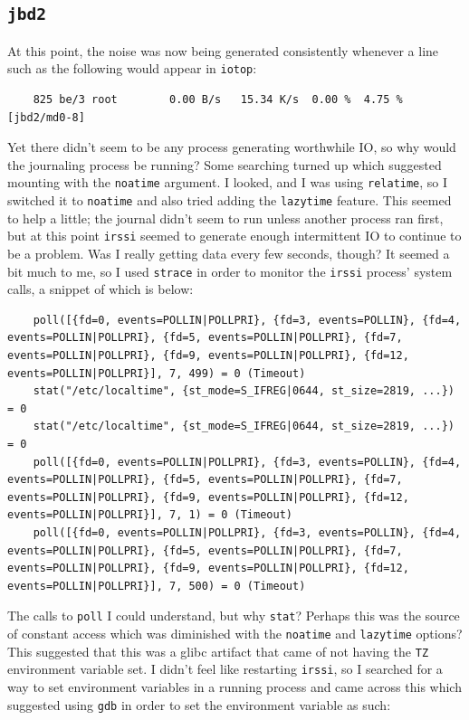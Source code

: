 \documentclass{article}
\begin{document}
\subsection{\texttt{jbd2}}
At this point, the noise was now being generated consistently whenever a line such as the following would appear in \texttt{iotop}:
\begin{verbatim}
	825 be/3 root        0.00 B/s   15.34 K/s  0.00 %  4.75 % [jbd2/md0-8]
\end{verbatim}
Yet there didn't seem to be any process generating worthwhile IO, so why would the journaling process be running?  Some searching turned up  which suggested mounting with the \texttt{noatime} argument.  I looked, and I was using \texttt{relatime}, so I switched it to \texttt{noatime} and also tried adding the \texttt{lazytime} feature.  This seemed to help a little; the journal didn't seem to run unless another process ran first, but at this point \texttt{irssi} seemed to generate enough intermittent IO to continue to be a problem.  Was I really getting data every few seconds, though?  It seemed a bit much to me, so I used \texttt{strace} in order to monitor the \texttt{irssi} process' system calls, a snippet of which is below:
\begin{verbatim}
	poll([{fd=0, events=POLLIN|POLLPRI}, {fd=3, events=POLLIN}, {fd=4, events=POLLIN|POLLPRI}, {fd=5, events=POLLIN|POLLPRI}, {fd=7, events=POLLIN|POLLPRI}, {fd=9, events=POLLIN|POLLPRI}, {fd=12, events=POLLIN|POLLPRI}], 7, 499) = 0 (Timeout)
	stat("/etc/localtime", {st_mode=S_IFREG|0644, st_size=2819, ...}) = 0
	stat("/etc/localtime", {st_mode=S_IFREG|0644, st_size=2819, ...}) = 0
	poll([{fd=0, events=POLLIN|POLLPRI}, {fd=3, events=POLLIN}, {fd=4, events=POLLIN|POLLPRI}, {fd=5, events=POLLIN|POLLPRI}, {fd=7, events=POLLIN|POLLPRI}, {fd=9, events=POLLIN|POLLPRI}, {fd=12, events=POLLIN|POLLPRI}], 7, 1) = 0 (Timeout)
	poll([{fd=0, events=POLLIN|POLLPRI}, {fd=3, events=POLLIN}, {fd=4, events=POLLIN|POLLPRI}, {fd=5, events=POLLIN|POLLPRI}, {fd=7, events=POLLIN|POLLPRI}, {fd=9, events=POLLIN|POLLPRI}, {fd=12, events=POLLIN|POLLPRI}], 7, 500) = 0 (Timeout)
\end{verbatim}
The calls to \texttt{poll} I could understand, but why \texttt{stat}?  Perhaps this was the source of constant access which was diminished with the \texttt{noatime} and \texttt{lazytime} options?  This  suggested that this was a glibc artifact that came of not having the \texttt{TZ} environment variable set.  I didn't feel like restarting \texttt{irssi}, so I searched for a way to set environment variables in a running process and came across this  which suggested using \texttt{gdb} in order to set the environment variable as such:
\end{document}
